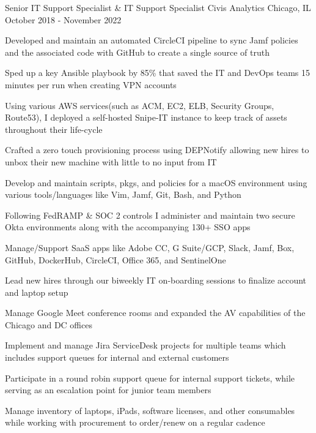 \begin{cventries}
	\cventry
	{Senior IT Support Specialist \& IT Support Specialist} %
	{Civis Analytics} %
	{Chicago, IL} %
	{October 2018 - November 2022} %
	{
		\begin{cvitems} %
			\item {Developed and maintain an automated CircleCI pipeline to sync Jamf policies and the associated code with GitHub to create a single source of truth}
			\item {Sped up a key Ansible playbook by 85\% that saved the IT and DevOps teams 15 minutes per run when creating VPN accounts}
			\item {Using various AWS services(such as ACM, EC2, ELB, Security Groups, Route53), I deployed a self-hosted Snipe-IT instance to keep track of assets throughout their life-cycle}
			\item {Crafted a zero touch provisioning process using DEPNotify allowing new hires to unbox their new machine with little to no input from IT}
			\item {Develop and maintain scripts, pkgs, and policies for a macOS environment using various tools/languages like Vim, Jamf, Git, Bash, and Python}
			\item {Following FedRAMP \& SOC 2 controls I administer and maintain two secure Okta environments along with the accompanying 130+ SSO apps}
			\item {Manage/Support SaaS apps like Adobe CC, G Suite/GCP, Slack, Jamf, Box, GitHub, DockerHub, CircleCI, Office 365, and SentinelOne}
			\item {Lead new hires through our biweekly IT on-boarding sessions to finalize account and laptop setup}
			\item {Manage Google Meet conference rooms and expanded the AV capabilities of the Chicago and DC offices}
			\item {Implement and manage Jira ServiceDesk projects for multiple teams which includes support queues for internal and external customers}
			\item {Participate in a round robin support queue for internal support tickets, while serving as an escalation point for junior team members}
			\item {Manage inventory of laptops, iPads, software licenses, and other consumables while working with procurement to order/renew on a regular cadence}
		\end{cvitems}
	}


\end{cventries}
